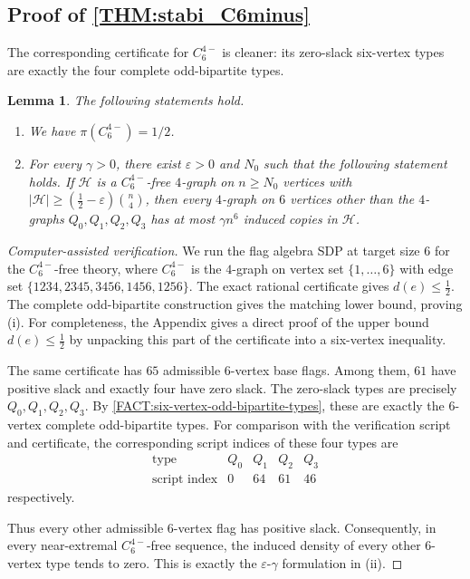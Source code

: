 \documentclass[10pt,a4paper]{article}
\theoremstyle{plain}
\newtheorem{lemma}[lemma]{Lemma}
\theoremstyle{definition}
\begin{document}
\subsection[Proof of Theorem]{Proof of \texorpdfstring{\cref{THM:stabi_C6minus}}{Theorem}}\label{SEC:C6minus}

The corresponding certificate for $C_6^{4-}$ is cleaner: its zero-slack six-vertex types are exactly the four complete odd-bipartite types.

\begin{lemma}\label{LEM:density_C6minus}\label{LEM:no_6vertex_C6minus}
The following statements hold.
\begin{enumerate}[label=\textup{(\roman*)}]
\item We have $\pi(C_{6}^{4-}) = 1/2$.
\item For every $\gamma > 0$, there exist $\varepsilon > 0$ and $N_0$ such that the following statement holds.  If $\mathcal{H}$ is a $C_{6}^{4-}$-free $4$-graph on $n \ge N_0$ vertices with $|\mathcal{H}| \ge \left(\frac{1}{2}-\varepsilon\right)\binom{n}{4}$, then every $4$-graph on $6$ vertices other than the $4$-graphs $Q_0,Q_1,Q_2,Q_3$ has at most $\gamma n^6$ induced copies in $\mathcal{H}$.
\end{enumerate}
\end{lemma}

\begin{proof}[Computer-assisted verification]
We run the flag algebra SDP at target size $6$ for the $C_6^{4-}$-free theory, where $C_6^{4-}$ is the $4$-graph on vertex set $\{1,\ldots,6\}$ with edge set $\{1234,2345,3456,1456,1256\}$.
The exact rational certificate gives $d(e)\le \frac12$.
The complete odd-bipartite construction gives the matching lower bound, proving \textup{(i)}.
For completeness, the Appendix gives a direct proof of the upper bound $d(e)\le \frac12$ by unpacking this part of the certificate into a six-vertex inequality.

The same certificate has $65$ admissible $6$-vertex base flags.  Among them, $61$ have positive slack and exactly four have zero slack.  The zero-slack types are precisely
$Q_0,Q_1,Q_2,Q_3$.
By \cref{FACT:six-vertex-odd-bipartite-types}, these are exactly the $6$-vertex complete odd-bipartite types.
For comparison with the verification script and certificate, the corresponding script indices of these four types are
\[
\begin{array}{c|cccc}
\text{type} & Q_0 & Q_1 & Q_2 & Q_3\\
\hline
\text{script index} & 0 & 64 & 61 & 46
\end{array}
\]
respectively.

Thus every other admissible $6$-vertex flag has positive slack.  Consequently, in every near-extremal $C_6^{4-}$-free sequence, the induced density of every other $6$-vertex type tends to zero.  This is exactly the $\varepsilon$-$\gamma$ formulation in \textup{(ii)}.
\end{proof}
\end{document}
